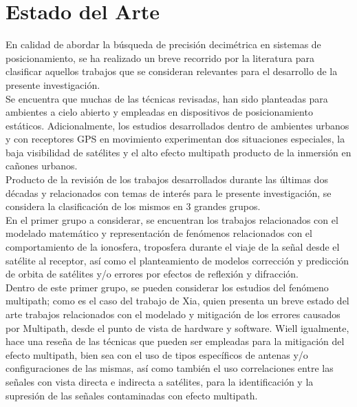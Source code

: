 \chapter{Estado del Arte}
\label{sec:estadodelarte}

En calidad de abordar la búsqueda de precisión decimétrica en sistemas de posicionamiento, se ha realizado un breve recorrido por la literatura para clasificar aquellos trabajos que se consideran relevantes para el desarrollo de la presente investigación.\\ 

Se encuentra que muchas de las técnicas revisadas, han sido planteadas para ambientes a cielo abierto y empleadas en dispositivos de posicionamiento estáticos. Adicionalmente, los estudios desarrollados dentro de ambientes urbanos y con receptores GPS en movimiento experimentan dos situaciones especiales, la baja visibilidad de satélites y el alto efecto multipath producto de la inmersión en cañones urbanos.\\

Producto de la revisión de los trabajos desarrollados durante las últimas dos décadas y relacionados con temas de interés para le presente investigación, se considera la clasificación de los mismos en 3 grandes grupos. \\

En el primer grupo a considerar, se encuentran los trabajos relacionados con el modelado matemático y representación de fenómenos relacionados con el comportamiento de la ionosfera, troposfera durante el viaje de la señal desde el satélite al receptor, así como el planteamiento de modelos corrección y predicción de orbita de satélites y/o errores por efectos de reflexión y difracción.\\

Dentro de este primer grupo, se pueden considerar los estudios del fenómeno multipath; como es el caso del trabajo de Xia\cite{Xia_2004}, quien presenta un breve estado del arte trabajos relacionados con el modelado y mitigación de los errores causados por Multipath, desde el punto de vista de hardware y software. Wiell\cite{Weill} igualmente, hace una reseña de las técnicas que pueden ser empleadas para la mitigación del efecto multipath, bien sea con el uso de tipos específicos de antenas y/o configuraciones de las mismas, así como también el uso correlaciones entre las señales con vista directa e indirecta a satélites, para la identificación y la supresión de las señales contaminadas con efecto multipath.\\

